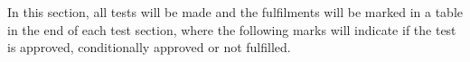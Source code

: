 In this section, all tests will be made and the fulfilments will be marked in a table in the end of each test section, where the following marks will indicate if the test is approved, conditionally approved or not fulfilled.
 \vspace{1cm}
    \startexplain
    \stopexplain